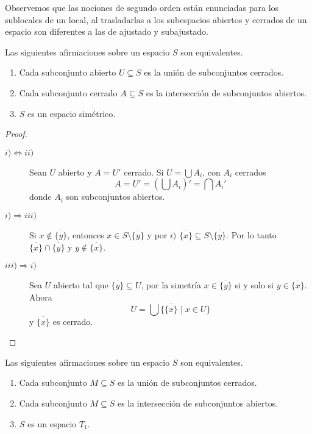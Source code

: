 Observemos que las nociones de segundo orden están enunciadas para los sublocales de un local, al trasladarlas a los subespacios abiertos y cerrados de un espacio son diferentes a las de ajustado y subajustado.

\begin{prop}
Las siguientes afirmaciones sobre un espacio $S$ son equivalentes.
\begin{enumerate}[$i)$]
    \item Cada subconjunto abierto $U\subseteq S$ es la unión de subconjuntos cerrados.
    \item Cada subconjunto cerrado $A\subseteq S$ es la intersección de subconjuntos abiertos.
    \item $S$ es un espacio simétrico.
\end{enumerate}
\end{prop}

\begin{proof}
    \begin{description}
        \item[$i)\Leftrightarrow ii)$] Sean $U$ abierto y $A=U'$ cerrado. Si $U=\bigcup A_i$, con $A_i$ cerrados
        \[
        A=U'=(\bigcup A_i)'=\bigcap A_i'
        \]
        donde $A_i$ son subconjuntos abiertos.
        \item[$i)\Rightarrow iii)$] Si $x\notin \overline{\{y\}}$, entonces $x\in S\setminus \overline{\{y\}}$ y por $i)$ $\overline{\{x\}}\subseteq S\setminus \overline{\{y\}}$. Por lo tanto $\overline{\{x\}}\cap \overline{\{y\}}$ y $y\notin \overline{\{x\}}$. 
        \item[$iii)\Rightarrow i)$] Sea $U$ abierto tal que $\overline{\{y\}}\subseteq U$, por la simetría $x\in \overline{\{y\}}$ si y solo si $y\in \overline{\{x\}}$. Ahora 
        \[
        U=\bigcup\{\overline{\{x\}}\mid x\in U\}
        \]
        y $\overline{\{x\}}$ es cerrado.
    \end{description}
\end{proof}

\begin{prop}
    Las siguientes afirmaciones sobre un espacio $S$ son equivalentes.
    \begin{enumerate}[$i)$]
        \item Cada subconjunto $M\subseteq S$ es la unión de subconjuntos cerrados.
        \item Cada subconjunto $M\subseteq S$ es la intersección de subconjuntos abiertos.
        \item $S$ es un espacio $T_1$.
    \end{enumerate}
\end{prop}

